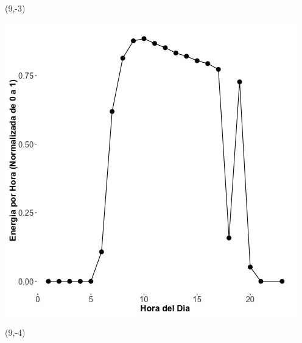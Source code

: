 \documentclass{article}\usepackage[]{graphicx}\usepackage[]{color}
\newenvironment{knitrout}{}{} %
\begin{document}
 \begin{textblock}{1}(9,-3)
\begin{minipage}{20em}
\begingroup

\endgroup
\end{minipage}
\end{textblock}

 \vspace{2cm}

\begin{knitrout}
\color{fgcolor}
\includegraphics[scale=0.75]{figure/A24_fplot_norm_median} 
\end{knitrout}


 \begin{textblock}{1}(9,-4)
\begin{minipage}{20em}
\begingroup

\endgroup
\end{minipage}
\end{textblock}

 \vspace{2cm}
\end{document}
